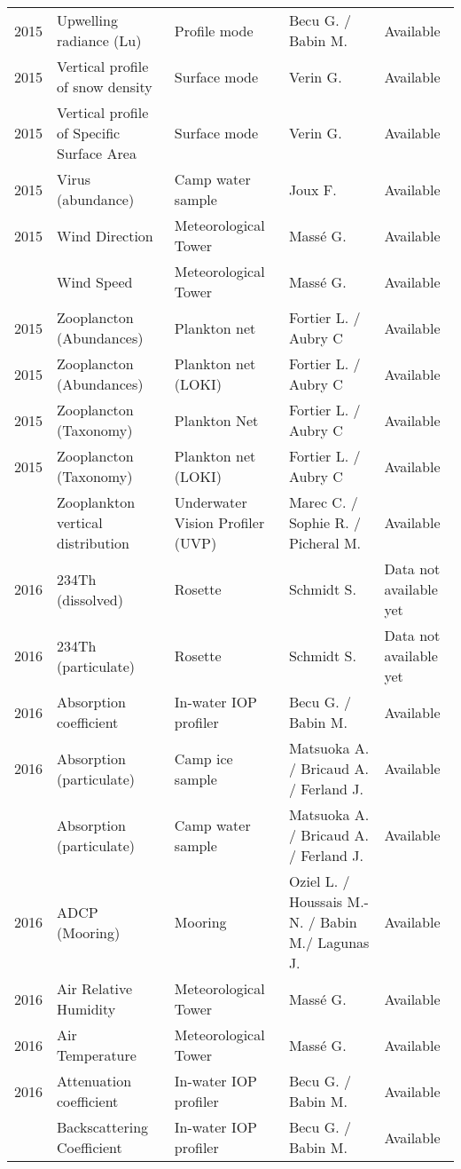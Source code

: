 \documentclass[]{article}
\begin{document}
\begin{landscape}
\begin{longtable}{rllll}
2015 & Upwelling radiance (Lu) & Profile mode & Becu G. / Babin M. & Available\\
2015 & Vertical profile of snow density & Surface mode & Verin G. & Available\\
2015 & Vertical profile of Specific Surface Area & Surface mode & Verin G. & Available\\
2015 & Virus (abundance) & Camp water sample & Joux F. & Available\\
2015 & Wind Direction & Meteorological Tower & Massé G. & Available\\
\addlinespace
2015 & Wind Speed & Meteorological Tower & Massé G. & Available\\
2015 & Zooplancton (Abundances) & Plankton net & Fortier L. / Aubry C & Available\\
2015 & Zooplancton (Abundances) & Plankton net (LOKI) & Fortier L. / Aubry C & Available\\
2015 & Zooplancton (Taxonomy) & Plankton Net & Fortier L. / Aubry C & Available\\
2015 & Zooplancton (Taxonomy) & Plankton net (LOKI) & Fortier L. / Aubry C & Available\\
\addlinespace
2015 & Zooplankton vertical distribution & Underwater Vision Profiler (UVP) & Marec C. / Sophie R. / Picheral M. & Available\\
2016 & 234Th (dissolved) & Rosette & Schmidt S. & Data not available yet\\
2016 & 234Th (particulate) & Rosette & Schmidt S. & Data not available yet\\
2016 & Absorption coefficient & In-water IOP profiler & Becu G. / Babin M. & Available\\
2016 & Absorption (particulate) & Camp ice sample & Matsuoka A. / Bricaud A. / Ferland J. & Available\\
\addlinespace
2016 & Absorption (particulate) & Camp water sample & Matsuoka A. / Bricaud A. / Ferland J. & Available\\
2016 & ADCP (Mooring) & Mooring & Oziel L. / Houssais M.-N. / Babin M./ Lagunas J. & Available\\
2016 & Air Relative Humidity & Meteorological Tower & Massé G. & Available\\
2016 & Air Temperature & Meteorological Tower & Massé G. & Available\\
2016 & Attenuation coefficient & In-water IOP profiler & Becu G. / Babin M. & Available\\
\addlinespace
2016 & Backscattering Coefficient & In-water IOP profiler & Becu G. / Babin M. & Available\\

\end{longtable}
\end{landscape}
\end{document}
